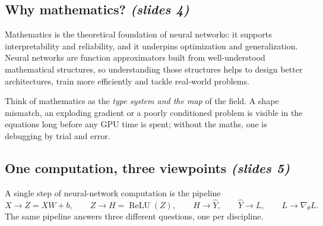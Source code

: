 \documentclass[11pt,a4paper]{article}
\newcommand{\ReLU}{\operatorname{ReLU}}
\newcommand{\slides}[1]{\texorpdfstring{\emph{(slides #1)}}{(slides #1)}}
\theoremstyle{definition}
\theoremstyle{plain}
\begin{document}
\subsection{Why mathematics? \slides{4}}

Mathematics is the theoretical foundation of neural networks: it supports interpretability and reliability, and it underpins optimization and generalization. Neural networks are function approximators built from well-understood mathematical structures, so understanding those structures helps to design better architectures, train more efficiently and tackle real-world problems.

\begin{intuition}
Think of mathematics as the \emph{type system and the map} of the field. A shape mismatch, an exploding gradient or a poorly conditioned problem is visible in the equations long before any GPU time is spent; without the maths, one is debugging by trial and error.
\end{intuition}

\subsection{One computation, three viewpoints \slides{5}}

A single step of neural-network computation is the pipeline
\[
X \to Z = XW + b,\qquad Z \to H = \ReLU(Z),\qquad H \to \hat Y,\qquad \hat Y \to L,\qquad L \to \nabla_\theta L .
\]                                       
The same pipeline answers three different questions, one per discipline.
\end{document}
